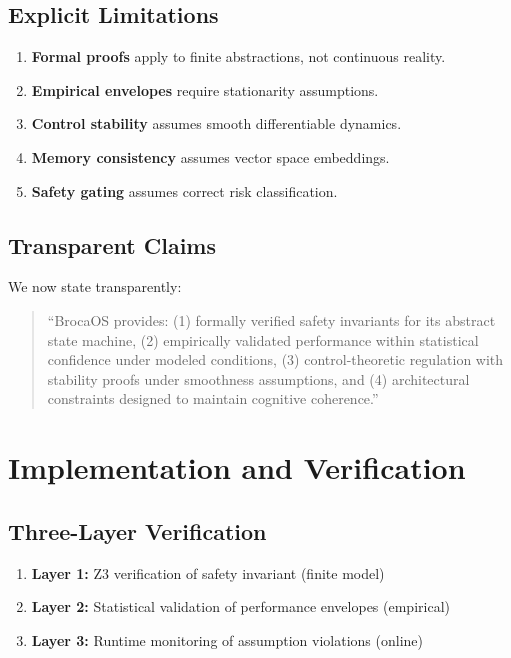 \documentclass[12pt]{article}
\theoremstyle{definition}
\begin{document}
\subsection{Explicit Limitations}

\begin{enumerate}
    \item \textbf{Formal proofs} apply to finite abstractions, not continuous reality.
    \item \textbf{Empirical envelopes} require stationarity assumptions.
    \item \textbf{Control stability} assumes smooth differentiable dynamics.
    \item \textbf{Memory consistency} assumes vector space embeddings.
    \item \textbf{Safety gating} assumes correct risk classification.
\end{enumerate}

\subsection{Transparent Claims}

We now state transparently:

\begin{quote}
``BrocaOS provides: (1) formally verified safety invariants for its abstract state machine, (2) empirically validated performance within statistical confidence under modeled conditions, (3) control-theoretic regulation with stability proofs under smoothness assumptions, and (4) architectural constraints designed to maintain cognitive coherence.''
\end{quote}

\section{Implementation and Verification}

\subsection{Three-Layer Verification}

\begin{enumerate}
    \item \textbf{Layer 1:} Z3 verification of safety invariant (finite model)
    \item \textbf{Layer 2:} Statistical validation of performance envelopes (empirical)
    \item \textbf{Layer 3:} Runtime monitoring of assumption violations (online)
\end{enumerate}
\end{document}
